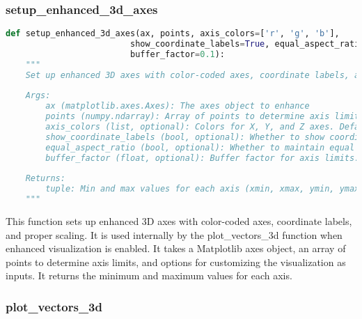 \subsubsection{setup\_enhanced\_3d\_axes}

\begin{lstlisting}[language=Python]
def setup_enhanced_3d_axes(ax, points, axis_colors=['r', 'g', 'b'], 
                         show_coordinate_labels=True, equal_aspect_ratio=True,
                         buffer_factor=0.1):
    """
    Set up enhanced 3D axes with color-coded axes, coordinate labels, and proper scaling.
    
    Args:
        ax (matplotlib.axes.Axes): The axes object to enhance
        points (numpy.ndarray): Array of points to determine axis limits
        axis_colors (list, optional): Colors for X, Y, and Z axes. Defaults to ['r', 'g', 'b'].
        show_coordinate_labels (bool, optional): Whether to show coordinate labels. Defaults to True.
        equal_aspect_ratio (bool, optional): Whether to maintain equal aspect ratio. Defaults to True.
        buffer_factor (float, optional): Buffer factor for axis limits. Defaults to 0.1.
        
    Returns:
        tuple: Min and max values for each axis (xmin, xmax, ymin, ymax, zmin, zmax)
    """
\end{lstlisting}

This function sets up enhanced 3D axes with color-coded axes, coordinate labels, and proper scaling. It is used internally by the plot\_vectors\_3d function when enhanced visualization is enabled. It takes a Matplotlib axes object, an array of points to determine axis limits, and options for customizing the visualization as inputs. It returns the minimum and maximum values for each axis.

\subsubsection{plot\_vectors\_3d}

